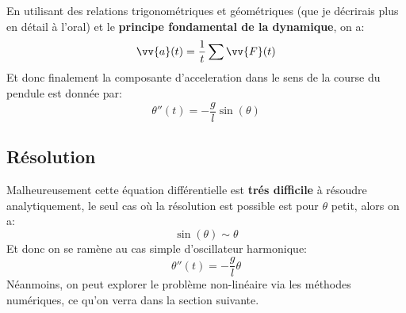    \pagebreak
   En utilisant des relations trigonométriques et géométriques (que je décrirais plus en détail à l'oral) et le \textbf{principe fondamental de la dynamique}, on a:
   \[
      \vv{a}(t) = \frac{1}{t}\sum\vv{F}(t)
   \]
   Et donc finalement la composante d'acceleration dans le sens de la course du pendule est donnée par:
   \[
      \boxed{\theta''(t) = - \frac{g}{l}\sin(\theta)}
   \]
   \subsection{Résolution}
   Malheureusement cette équation différentielle est \textbf{trés difficile} à résoudre analytiquement, le seul cas où la résolution est possible est pour \(\theta\) petit, alors on a:
   \[
      \sin(\theta) \sim \theta
   \]
   Et donc on se ramène au cas simple d'oscillateur harmonique:
   \[
      \theta''(t) = -\frac{g}{l}\theta
   \]
   Néanmoins, on peut explorer le problème non-linéaire via les méthodes numériques, ce qu'on verra dans la section suivante.
   
